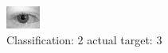 \begin{figure}[h!]
\begin{center}
\includegraphics[width=0.60\columnwidth]{figures/ID572_class_2_target_3.png}
\end{center}
\caption{ Classification: 2 actual target: 3}
\label{fig:ID572_class_2_target_3}
\end{figure}
